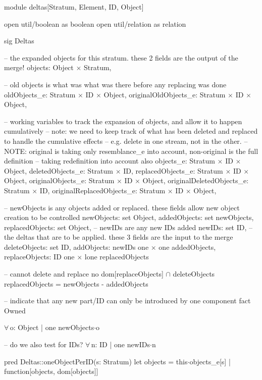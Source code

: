 module deltas[Stratum, Element, ID, Object]

open util/boolean as boolean
open util/relation as relation

sig Deltas
{
  -- the expanded objects for this stratum.  these 2 fields are the output of the merge!
  objects:              Object$\,\times\,$Stratum,

  -- old objects is what was what was there before any replacing was done
  oldObjects_e:        Stratum$\,\times\,$ID$\,\times\,$Object,
  originalOldObjects_e:    Stratum$\,\times\,$ID$\,\times\,$Object,

  -- working variables to track the expansion of objects, and allow it to happen cumulatively
  -- note: we need to keep track of what has been deleted and replaced to handle the cumulative effects
  -- e.g. delete in one stream, not in the other.
  -- NOTE: original is taking only resemblance_e into account, non-original is the full definition
  --       taking redefinition into account also
  objects_e: Stratum$\,\times\,$ID$\,\times\,$Object,
  deletedObjects_e:            Stratum$\,\times\,$ID,
  replacedObjects_e:           Stratum$\,\times\,$ID$\,\times\,$Object,  
  originalObjects_e:           Stratum$\,\times\,$ID$\,\times\,$Object,
  originalDeletedObjects_e:    Stratum$\,\times\,$ID,
  originalReplacedObjects_e:   Stratum$\,\times\,$ID$\,\times\,$Object,
  
  -- newObjects is any objects added or replaced.  these fields allow new object creation to be controlled
  newObjects:            set Object,
  addedObjects:          set newObjects,
  replacedObjects:       set Object,
  -- newIDs are any new IDs added
  newIDs:                set ID,  
  -- the deltas that are to be applied.  these 3 fields are the input to the merge
  deleteObjects:        set ID,
  addObjects:           newIDs one$\,\times\,$one addedObjects,
  replaceObjects:       ID one$\,\times\,$lone replacedObjects
}
{
  -- cannot delete and replace
  no dom[replaceObjects] $\cap$ deleteObjects
  replacedObjects = newObjects - addedObjects
}

-- indicate that any new part/ID can only be introduced by one component
fact Owned
{
  $\forall\,$o: Object |
    one newObjects$\cdot$o
  
  -- do we also test for IDs?
  $\forall\,$n: ID |
    one newIDs$\cdot$n
}


pred Deltas::oneObjectPerID(s: Stratum)
{
  let objects = this$\cdot$objects_e[s] |
    function[objects, dom[objects]]
}


